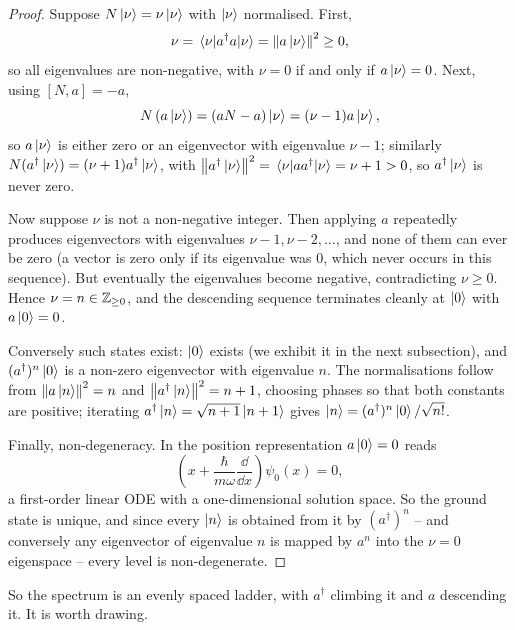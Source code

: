 \documentclass[a4paper]{scrartcl}
\begin{document}
\begin{proof}
    Suppose $N\ket{\nu} = \nu \ket{\nu}$ with $\ket{\nu}$ normalised. First,
    $$
    \nu = \mel{\nu}{a^\dagger a}{\nu} = \norm{a\ket{\nu}}^2 \geq 0,
    $$
    so all eigenvalues are non-negative, with $\nu = 0$ if and only if $a \ket{\nu} = 0$. Next, using $[N,a] = -a$,
    $$
    N \left( a \ket{\nu} \right) = \left( aN - a \right)\ket{\nu} = (\nu - 1) a\ket{\nu},
    $$
    so $a\ket{\nu}$ is either zero or an eigenvector with eigenvalue $\nu - 1$; similarly $N(a^\dagger \ket{\nu}) = (\nu+1)a^\dagger\ket{\nu}$, with $\norm{a^\dagger\ket{\nu}}^2 = \mel{\nu}{aa^\dagger}{\nu} = \nu + 1 > 0$, so $a^\dagger \ket{\nu}$ is never zero.

    Now suppose $\nu$ is not a non-negative integer. Then applying $a$ repeatedly produces eigenvectors with eigenvalues $\nu - 1, \nu - 2, \dots$, and none of them can ever be zero (a vector is zero only if its eigenvalue was $0$, which never occurs in this sequence). But eventually the eigenvalues become negative, contradicting $\nu \geq 0$. Hence $\nu = n \in \mathbb{Z}_{\geq 0}$, and the descending sequence terminates cleanly at $\ket{0}$ with $a\ket{0} = 0$.

    Conversely such states exist: $\ket{0}$ exists (we exhibit it in the next subsection), and $(a^\dagger)^n\ket{0}$ is a non-zero eigenvector with eigenvalue $n$. The normalisations follow from $\norm{a\ket{n}}^2 = n$ and $\norm{a^\dagger \ket{n}}^2 = n+1$, choosing phases so that both constants are positive; iterating $a^\dagger\ket{n} = \sqrt{n+1}\ket{n+1}$ gives $\ket{n} = (a^\dagger)^n\ket{0}/\sqrt{n!}$.

    Finally, non-degeneracy. In the position representation $a\ket{0} = 0$ reads
    $$
    \left( x + \frac{\hbar}{m\omega}\frac{\dd}{\dd x} \right)\psi_0(x) = 0,
    $$
    a first-order linear ODE with a one-dimensional solution space. So the ground state is unique, and since every $\ket{n}$ is obtained from it by $(a^\dagger)^n$ -- and conversely any eigenvector of eigenvalue $n$ is mapped by $a^n$ into the $\nu = 0$ eigenspace -- every level is non-degenerate.
\end{proof}

So the spectrum is an evenly spaced ladder, with $a^\dagger$ climbing it and $a$ descending it. It is worth drawing.
\end{document}
